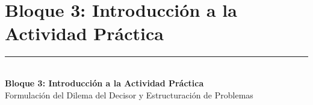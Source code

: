 \documentclass[aspectratio=169, 10pt]{beamer}
\begin{document}
\section{Bloque 3: Introducción a la Actividad Práctica}
\begingroup
{}
\begin{frame}[plain]
    \vfill
    \hspace{0.08\paperwidth}%
    {\color{UANLgold}\rule{4cm}{2pt}}\\[8pt]%
    \hspace{0.08\paperwidth}%
    {\color{FIMEwhite}\LARGE\rmfamily\bfseries Bloque 3: Introducción a la Actividad Práctica}\\[6pt]
    \hspace{0.08\paperwidth}%
    {\color{FIMEwhite!85}\large\sffamily Formulación del Dilema del Decisor y Estructuración de Problemas}
    \vfill
\end{frame}
\endgroup
\end{document}
